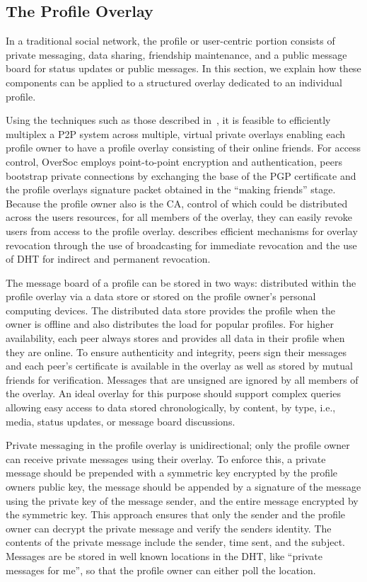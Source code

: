 \documentclass{IEEEtran}
\begin{document}
\subsection{The Profile Overlay}
\label{profile_overlay}

In a traditional social network, the profile or user-centric portion consists
of private messaging, data sharing, friendship maintenance, and a public
message board for status updates or public messages.  In this section, we
explain how these components can be applied to a structured overlay dedicated
to an individual profile.

Using the techniques such as those described in~\cite{vpo}, it is feasible to
efficiently multiplex a P2P system across multiple, virtual private overlays
enabling each profile owner to have a profile overlay consisting of their
online friends.  For access control, OverSoc employs point-to-point encryption
and authentication, peers bootstrap private connections by exchanging the base
of the PGP certificate and the profile overlays signature packet obtained in
the ``making friends'' stage.  Because the profile owner also is the CA,
control of which could be distributed across the users resources, for all
members of the overlay, they can easily revoke users from access to the profile
overlay.  \cite{vpo} describes efficient mechanisms for overlay revocation
through the use of broadcasting for immediate revocation and the use of DHT for
indirect and permanent revocation.

The message board of a profile can be stored in two ways: distributed within
the profile overlay via a data store or stored on the profile owner's personal
computing devices.  The distributed data store provides the profile when the
owner is offline and also distributes the load for popular profiles.  For
higher availability, each peer always stores and provides all data in their
profile when they are online.  To ensure authenticity and integrity, peers sign
their messages and each peer's certificate is available in the overlay as well
as stored by mutual friends for verification.  Messages that are unsigned are
ignored by all members of the overlay.  An ideal overlay for this purpose
should support complex queries~\cite{complex_queries} allowing easy access to
data stored chronologically, by content, by type, i.e., media, status updates,
or message board discussions.

Private messaging in the profile overlay is unidirectional; only the profile
owner can receive private messages using their overlay.  To enforce this, a
private message should be prepended with a symmetric key encrypted by the
profile owners public key, the message should be appended by a signature of the
message using the private key of the message sender, and the entire message
encrypted by the symmetric key.  This approach ensures that only the sender and
the profile owner can decrypt the private message and verify the senders
identity.  The contents of the private message include the sender, time sent,
and the subject.  Messages are be stored in well known locations in the DHT,
like ``private messages for me'', so that the profile owner can either poll the
location.
\end{document}
